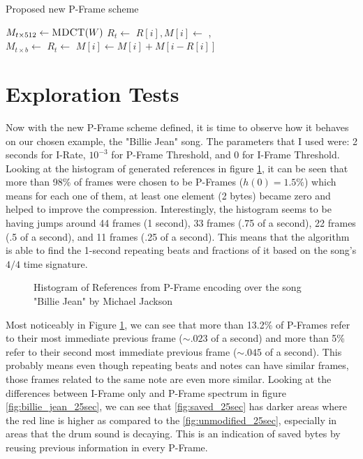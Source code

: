\begin{algorithm}[ht]
\caption{Proposed new P-Frame scheme}\label{alg:scheme}
\begin{algorithmic}
    \State $M_{t \times 512} \gets \Call{MDCT}{W}$
    \State $R_t \gets$ 
        \State $R[i], M[i] \gets$ 
    \EndFor
    \State \Return {}, 
\EndFunction
\\
    \State $M_{t \times b} \gets$ 
    \State $R_{t} \gets$ 
            \State $M[i] \gets M[i] + M[i-R[i]]$
        \EndIf
    \EndFor
    \State \Return {}
\EndFunction
\end{algorithmic}
\end{algorithm}

\section{Exploration Tests}
\label{sec:tests}

Now with the new P-Frame scheme defined, it is time to observe how it behaves on our chosen example, the "Billie Jean" song. The parameters that I used were: 2 seconds for I-Rate, $10^{-3}$ for P-Frame Threshold, and 0 for I-Frame Threshold. Looking at the histogram of generated references in figure \ref{fig:hist}, it can be seen that more than 98\% of frames were chosen to be P-Frames ($h(0)=1.5\%$) which means for each one of them, at least one element (2 bytes) became zero and helped to improve the compression. Interestingly, the histogram seems to be having jumps around 44 frames (1 second), 33 frames (.75 of a second), 22 frames (.5 of a second), and 11 frames (.25 of a second). This means that the algorithm is able to find the 1-second repeating beats and fractions of it based on the song's $4/4$ time signature. 

\begin{figure}[ht] 
    \centering
    
    \caption{Histogram of References from P-Frame encoding over the song "Billie Jean" by Michael Jackson}
    \label{fig:hist}
\end{figure}

Most noticeably in Figure \ref{fig:hist}, we can see that more than 13.2\% of P-Frames refer to their most immediate previous frame ($\sim .023$ of a second) and more than 5\% refer to their second most immediate previous frame ($\sim .045$ of a second). This probably means even though repeating beats and notes can have similar frames, those frames related to the same note are even more similar. Looking at the differences between I-Frame only and P-Frame spectrum in figure \ref{fig:billie_jean_25sec}, we can see that \ref{fig:saved_25sec} has darker areas where the red line is higher as compared to the \ref{fig:unmodified_25sec}, especially in areas that the drum sound is decaying. This is an indication of saved bytes by reusing previous information in every P-Frame.

